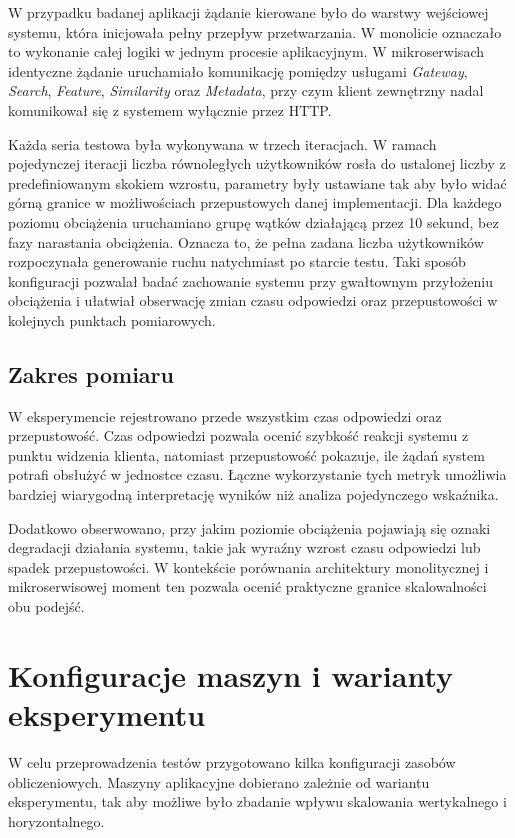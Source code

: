 W przypadku badanej aplikacji żądanie kierowane było do warstwy wejściowej systemu, która inicjowała pełny przepływ przetwarzania. W monolicie oznaczało to wykonanie całej logiki w jednym procesie aplikacyjnym. W mikroserwisach identyczne żądanie uruchamiało komunikację pomiędzy usługami \textit{Gateway}, \textit{Search}, \textit{Feature}, \textit{Similarity} oraz \textit{Metadata}, przy czym klient zewnętrzny nadal komunikował się z systemem wyłącznie przez HTTP.

Każda seria testowa była wykonywana w trzech iteracjach. W ramach pojedynczej iteracji liczba równoległych użytkowników rosła do ustalonej liczby z predefiniowanym skokiem wzrostu, parametry były ustawiane tak aby było widać górną granice w możliwościach przepustowych danej implementacji. Dla każdego poziomu obciążenia uruchamiano grupę wątków działającą przez 10 sekund, bez fazy narastania obciążenia. Oznacza to, że pełna zadana liczba użytkowników rozpoczynała generowanie ruchu natychmiast po starcie testu. Taki sposób konfiguracji pozwalał badać zachowanie systemu przy gwałtownym przyłożeniu obciążenia i ułatwiał obserwację zmian czasu odpowiedzi oraz przepustowości w kolejnych punktach pomiarowych.

\subsection{Zakres pomiaru}

W eksperymencie rejestrowano przede wszystkim czas odpowiedzi oraz przepustowość. Czas odpowiedzi pozwala ocenić szybkość reakcji systemu z punktu widzenia klienta, natomiast przepustowość pokazuje, ile żądań system potrafi obsłużyć w jednostce czasu. Łączne wykorzystanie tych metryk umożliwia bardziej wiarygodną interpretację wyników niż analiza pojedynczego wskaźnika.

Dodatkowo obserwowano, przy jakim poziomie obciążenia pojawiają się oznaki degradacji działania systemu, takie jak wyraźny wzrost czasu odpowiedzi lub spadek przepustowości. W kontekście porównania architektury monolitycznej i mikroserwisowej moment ten pozwala ocenić praktyczne granice skalowalności obu podejść.

\section{Konfiguracje maszyn i warianty eksperymentu}

W celu przeprowadzenia testów przygotowano kilka konfiguracji zasobów obliczeniowych. Maszyny aplikacyjne dobierano zależnie od wariantu eksperymentu, tak aby możliwe było zbadanie wpływu skalowania wertykalnego i horyzontalnego.

